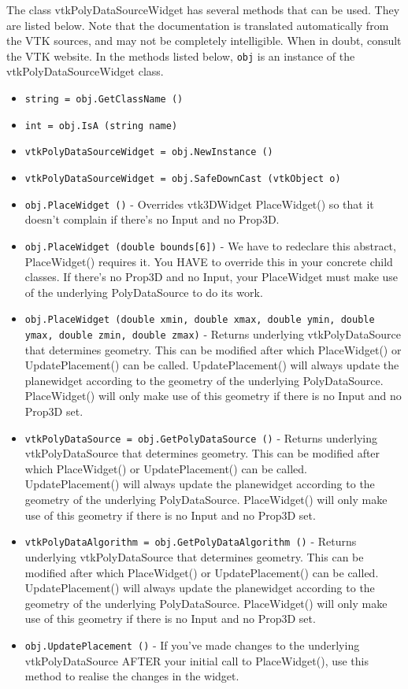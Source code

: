 The class vtkPolyDataSourceWidget has several methods that can be used.
  They are listed below.
Note that the documentation is translated automatically from the VTK sources,
and may not be completely intelligible.  When in doubt, consult the VTK website.
In the methods listed below, \verb|obj| is an instance of the vtkPolyDataSourceWidget class.
\begin{itemize}
\item  \verb|string = obj.GetClassName ()|

\item  \verb|int = obj.IsA (string name)|

\item  \verb|vtkPolyDataSourceWidget = obj.NewInstance ()|

\item  \verb|vtkPolyDataSourceWidget = obj.SafeDownCast (vtkObject o)|

\item  \verb|obj.PlaceWidget ()| -  Overrides vtk3DWidget PlaceWidget() so that it doesn't complain if
 there's no Input and no Prop3D.

\item  \verb|obj.PlaceWidget (double bounds[6])| -  We have to redeclare this abstract, PlaceWidget() requires it.  You HAVE
 to override this in your concrete child classes.  If there's no Prop3D
 and no Input, your PlaceWidget must make use of the underlying 
 PolyDataSource to do its work.

\item  \verb|obj.PlaceWidget (double xmin, double xmax, double ymin, double ymax, double zmin, double zmax)| -  Returns underlying vtkPolyDataSource that determines geometry.  This
 can be modified after which PlaceWidget() or UpdatePlacement() can be
 called.  UpdatePlacement() will always update the planewidget according
 to the geometry of the underlying PolyDataSource.  PlaceWidget() will
 only make use of this geometry if there is no Input and no Prop3D set.

\item  \verb|vtkPolyDataSource = obj.GetPolyDataSource ()| -  Returns underlying vtkPolyDataSource that determines geometry.  This
 can be modified after which PlaceWidget() or UpdatePlacement() can be
 called.  UpdatePlacement() will always update the planewidget according
 to the geometry of the underlying PolyDataSource.  PlaceWidget() will
 only make use of this geometry if there is no Input and no Prop3D set.

\item  \verb|vtkPolyDataAlgorithm = obj.GetPolyDataAlgorithm ()| -  Returns underlying vtkPolyDataSource that determines geometry.  This
 can be modified after which PlaceWidget() or UpdatePlacement() can be
 called.  UpdatePlacement() will always update the planewidget according
 to the geometry of the underlying PolyDataSource.  PlaceWidget() will
 only make use of this geometry if there is no Input and no Prop3D set.

\item  \verb|obj.UpdatePlacement ()| -  If you've made changes to the underlying vtkPolyDataSource AFTER your
 initial call to PlaceWidget(), use this method to realise the changes
 in the widget.

\end{itemize}
